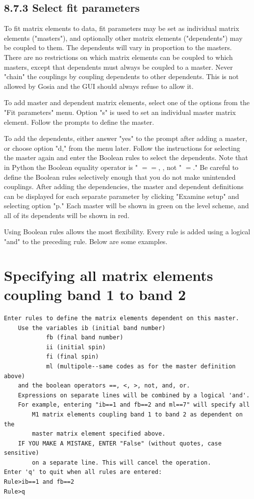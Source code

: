 \documentclass[10pt]{article}
\begin{document}
\subsection*{8.7.3 Select fit parameters}
To fit matrix elements to data, fit parameters may be set as individual matrix elements ("masters"), and optionally other matrix elements ("dependents") may be coupled to them. The dependents will vary in proportion to the masters. There are no restrictions on which matrix elements can be coupled to which masters, except that dependents must always be coupled to a master. Never "chain" the couplings by coupling dependents to other dependents. This is not allowed by Gosia and the GUI should always refuse to allow it.

To add master and dependent matrix elements, select one of the options from the "Fit parameters" menu. Option "s" is used to set an individual master matrix element. Follow the prompts to define the master.

To add the dependents, either answer "yes" to the prompt after adding a master, or choose option "d," from the menu later. Follow the instructions for selecting the master again and enter the Boolean rules to select the dependents. Note that in Python the Boolean equality operator is " $==$, , not " $=$." Be careful to define the Boolean rules selectively enough that you do not make unintended couplings. After adding the dependencies, the master and dependent definitions can be displayed for each separate parameter by clicking "Examine setup" and selecting option "p." Each master will be shown in green on the level scheme, and all of its dependents will be shown in red.

Using Boolean rules allows the most flexibility. Every rule is added using a logical "and" to the preceding rule. Below are some examples.

\section*{Specifying all matrix elements coupling band 1 to band 2}
\begin{verbatim}
Enter rules to define the matrix elements dependent on this master.
    Use the variables ib (initial band number)
            fb (final band number)
            ii (initial spin)
            fi (final spin)
            ml (multipole--same codes as for the master definition above)
    and the boolean operators ==, <, >, not, and, or.
    Expressions on separate lines will be combined by a logical 'and'.
    For example, entering "ib==1 and fb==2 and ml==7" will specify all
        M1 matrix elements coupling band 1 to band 2 as dependent on the
        master matrix element specified above.
    IF YOU MAKE A MISTAKE, ENTER "False" (without quotes, case sensitive)
        on a separate line. This will cancel the operation.
Enter 'q' to quit when all rules are entered:
Rule>ib==1 and fb==2
Rule>q
\end{verbatim}
\end{document}
